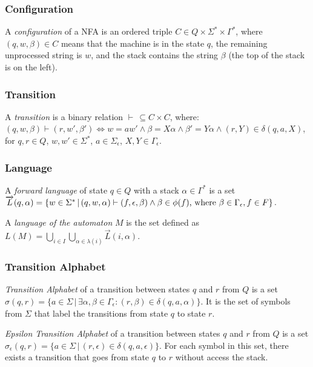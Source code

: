         \subsubsection*{Configuration}
            A \textit{configuration} of a NFA is an ordered triple $C \in Q \times \Sigma^* \times \Gamma^*$, where $(q, w, \beta) \in C$ means that the machine is in the state $q$, the remaining unprocessed string is $w$, and the stack contains the string $\beta$ (the top of the stack is on the left).

        \subsubsection*{Transition}
            A \textit{transition} is a binary relation $\vdash\, \subseteq C \times C$, where: $(q, w, \beta) \vdash (r, w', \beta') \iff w = aw' \land \beta = X\alpha \land \beta' = Y\alpha \land (r, Y) \in \delta(q, a, X)$, for $q, r \in Q$, $w, w' \in \Sigma^*$, $a \in \Sigma_\epsilon$, $X, Y \in \Gamma_\epsilon$.

        \subsubsection*{Language}
            A \textit{forward language} of state $q \in Q$ with a stack $\alpha \in \Gamma^*$ is a set $\overrightarrow L(q, \alpha) = \{w \in \Sigma^*\, |\, (q, w, \alpha) \vdash (f, \epsilon, \beta) \land \beta \in \phi(f)\textnormal{, where }\beta \in \Gamma_\epsilon, f \in F\}$.

            A \textit{language of the automaton} $M$ is the set defined as $L(M)=\bigcup_{i \in I} \bigcup_{\alpha \in \lambda(i)} \overrightarrow L(i, \alpha)$.

        \subsubsection*{Transition Alphabet}
            \textit{Transition Alphabet} of a transition between states $q$ and $r$ from $Q$ is a set $\sigma(q, r) = \{a \in \Sigma\,|\, \exists \alpha, \beta \in \Gamma_\epsilon: (r, \beta) \in \delta(q, a, \alpha)\}$. It is the set of symbols from $\Sigma$ that label the transitions from state $q$ to state $r$.

            \textit{Epsilon Transition Alphabet} of a transition between states $q$ and $r$ from $Q$ is a set $\sigma_\epsilon(q, r) = \{a \in \Sigma\,|\, (r, \epsilon) \in \delta(q, a, \epsilon)\}$. For each symbol in this set, there exists a transition that goes from state $q$ to $r$ without access the stack.

